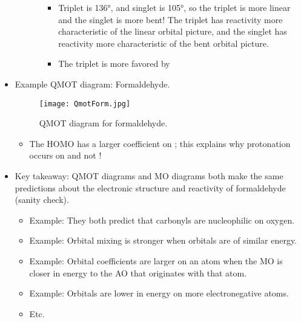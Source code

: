 \documentclass[../notes.tex]{subfiles}
\begin{document}
\begin{itemize}
\begin{itemize}
\begin{itemize}
\begin{itemize}
                \item Triplet is \ang{136}, and singlet is \ang{105}, so the triplet is more linear and the singlet is more bent! The triplet has reactivity more characteristic of the linear orbital picture, and the singlet has reactivity more characteristic of the bent orbital picture.
                \item The triplet is more favored by 
            \end{itemize}
        \end{itemize}
    \end{itemize}
    \item Example QMOT diagram: Formaldehyde.
    \begin{figure}[h!]
        \centering
        \texttt{[image: QmotForm.jpg]}
        \caption{QMOT diagram for formaldehyde.}
        \label{fig:QmotForm}
    \end{figure}
    \begin{itemize}
        \item The HOMO has a larger coefficient on ; this explains why protonation occurs on  and not !
    \end{itemize}
    \item Key takeaway: QMOT diagrams and MO diagrams both make the same predictions about the electronic structure and reactivity of formaldehyde (sanity check).
    \begin{itemize}
        \item Example: They both predict that carbonyls are nucleophilic on oxygen.
        \item Example: Orbital mixing is stronger when orbitals are of similar energy.
        \item Example: Orbital coefficients are larger on an atom when the MO is closer in energy to the AO that originates with that atom.
        \item Example: Orbitals are lower in energy on more electronegative atoms.
        \item Etc.
    \end{itemize}
\end{itemize}
\end{document}
